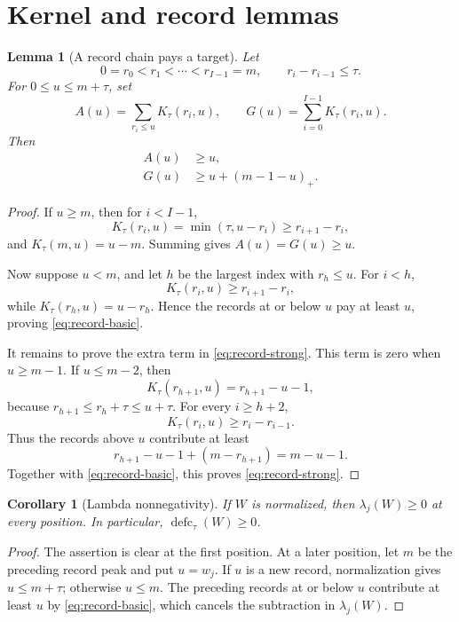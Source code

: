 \documentclass[11pt]{article}
\newtheorem{corollary}[theorem]{Corollary}
\newtheorem{lemma}[theorem]{Lemma}
\theoremstyle{definition}
\theoremstyle{remark}
\newcommand{\defc}{\operatorname{defc}}
\begin{document}
\section{Kernel and record lemmas}

\begin{lemma}[A record chain pays a target]
\label{lem:record-payment}
Let
\[
  0=r_0<r_1<\cdots<r_{I-1}=m,
  \qquad r_i-r_{i-1}\le\tau.
\]
For \(0\le u\le m+\tau\), set
\[
  A(u)=\sum_{r_i\le u}K_\tau(r_i,u),
  \qquad
  G(u)=\sum_{i=0}^{I-1}K_\tau(r_i,u).
\]
Then
\begin{align}
  A(u)&\ge u,
  \label{eq:record-basic}\\
  G(u)&\ge u+(m-1-u)_+.
  \label{eq:record-strong}
\end{align}
\end{lemma}

\begin{proof}
If \(u\ge m\), then for \(i<I-1\),
\[
  K_\tau(r_i,u)=\min(\tau,u-r_i)\ge r_{i+1}-r_i,
\]
and \(K_\tau(m,u)=u-m\).  Summing gives \(A(u)=G(u)\ge u\).

Now suppose \(u<m\), and let \(h\) be the largest index with
\(r_h\le u\).  For \(i<h\),
\[
  K_\tau(r_i,u)\ge r_{i+1}-r_i,
\]
while \(K_\tau(r_h,u)=u-r_h\).  Hence the records at or below \(u\)
pay at least \(u\), proving \eqref{eq:record-basic}.

It remains to prove the extra term in \eqref{eq:record-strong}.  This term
is zero when \(u\ge m-1\).  If \(u\le m-2\), then
\[
  K_\tau(r_{h+1},u)=r_{h+1}-u-1,
\]
because \(r_{h+1}\le r_h+\tau\le u+\tau\).  For every
\(i\ge h+2\),
\[
  K_\tau(r_i,u)\ge r_i-r_{i-1}.
\]
Thus the records above \(u\) contribute at least
\[
  r_{h+1}-u-1+(m-r_{h+1})=m-u-1.
\]
Together with \eqref{eq:record-basic}, this proves
\eqref{eq:record-strong}.
\end{proof}

\begin{corollary}[Lambda nonnegativity]
\label{cor:lambda-nonnegative}
If \(W\) is normalized, then \(\lambda_j(W)\ge0\) at every position.
In particular, \(\defc_\tau(W)\ge0\).
\end{corollary}

\begin{proof}
The assertion is clear at the first position.  At a later position, let
\(m\) be the preceding record peak and put \(u=w_j\).  If \(u\) is a new
record, normalization gives \(u\le m+\tau\); otherwise \(u\le m\).
The preceding records at or below \(u\) contribute at least \(u\) by
\eqref{eq:record-basic}, which cancels the subtraction in
\(\lambda_j(W)\).
\end{proof}
\end{document}

